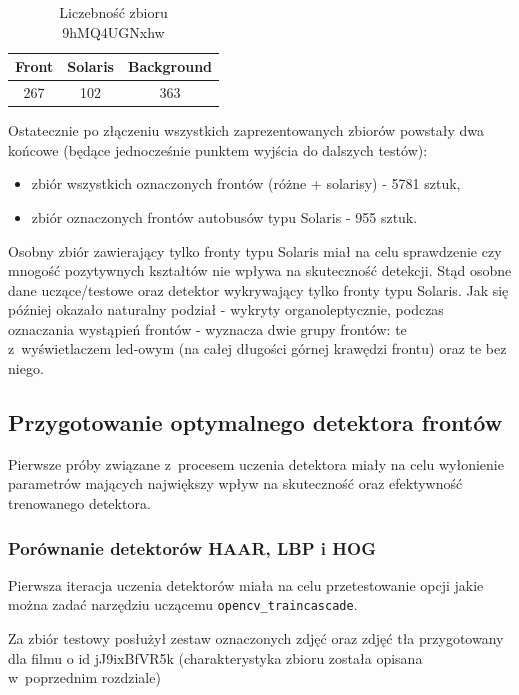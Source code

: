 \begin{table}[!h]
    \centering
    \begin{tabular}{c|c|c}
        Front   & Solaris   & Background \\ \hline
        267     & 102       & 363 
    \end{tabular}
    \caption{Liczebność zbioru 9hMQ4UGNxhw}
    \label{tab:9hMQ4UGNxhw_count}
\end{table}

Ostatecznie po złączeniu wszystkich zaprezentowanych zbiorów powstały
dwa końcowe (będące jednocześnie punktem wyjścia do dalszych testów):
\begin{itemize}
    \item zbiór wszystkich oznaczonych frontów (różne + solarisy) 
        - 5781 sztuk,
    \item zbiór oznaczonych frontów autobusów typu Solaris - 955 sztuk.
\end{itemize}

Osobny zbiór zawierający tylko fronty typu Solaris miał na celu
sprawdzenie czy mnogość pozytywnych kształtów nie wpływa na skuteczność
detekcji. Stąd osobne dane uczące/testowe oraz detektor wykrywający 
tylko fronty typu Solaris. Jak się później okazało naturalny podział
- wykryty organoleptycznie, podczas oznaczania wystąpień frontów - 
wyznacza dwie grupy frontów: te z~wyświetlaczem led-owym (na całej
długości górnej krawędzi frontu) oraz te bez niego.

\subsection{Przygotowanie optymalnego detektora frontów}

Pierwsze próby związane z~procesem uczenia detektora miały na celu 
wyłonienie parametrów mających największy wpływ na skuteczność 
oraz efektywność trenowanego detektora.

\subsubsection{Porównanie detektorów HAAR, LBP i HOG}

Pierwsza iteracja uczenia detektorów miała na celu przetestowanie
opcji jakie można zadać narzędziu uczącemu \verb|opencv_traincascade|.

Za zbiór testowy posłużył zestaw oznaczonych zdjęć oraz zdjęć tła
przygotowany dla filmu o id jJ9ixBfVR5k (charakterystyka zbioru
została opisana w~poprzednim rozdziale)

